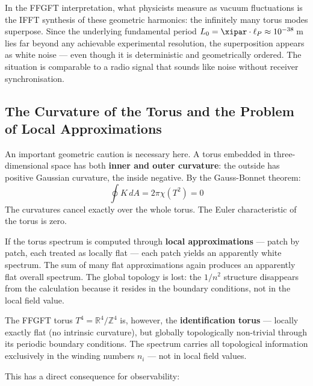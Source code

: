 \begin{interpretation}
In the FFGFT interpretation, what physicists measure as vacuum fluctuations is the IFFT synthesis of these
geometric harmonics: the infinitely many torus modes superpose. Since the
underlying fundamental period $L_0 = \xipar \cdot \ell_P \approx 10^{-38}$\,m
lies far beyond any achievable experimental resolution, the superposition appears
as white noise — even though it is deterministic and geometrically ordered.
The situation is comparable to a radio signal
that sounds like noise without receiver synchronisation.
\end{interpretation}

\subsection{The Curvature of the Torus and the Problem of Local Approximations}

An important geometric caution is necessary here. A torus embedded in
three-dimensional space has both \textbf{inner and outer curvature}: the outside
has positive Gaussian curvature, the inside negative. By the Gauss-Bonnet theorem:
\begin{equation}
    \oint K \, dA = 2\pi \chi(T^2) = 0
\end{equation}
The curvatures cancel exactly over the whole torus. The Euler characteristic of
the torus is zero.

\begin{important}
If the torus spectrum is computed through \textbf{local approximations} —
patch by patch, each treated as locally flat — each patch yields an apparently
white spectrum. The sum of many flat approximations again produces an apparently
flat overall spectrum. The global topology is lost: the $1/n^2$ structure
disappears from the calculation because it resides in the boundary conditions,
not in the local field value.
\end{important}

The FFGFT torus $T^4 = \mathbb{R}^4/\mathbb{Z}^4$ is, however, the
\textbf{identification torus} — locally exactly flat (no intrinsic curvature),
but globally topologically non-trivial through its periodic boundary conditions.
The spectrum carries all topological information exclusively in the winding
numbers $n_i$ — not in local field values.

This has a direct consequence for observability:

